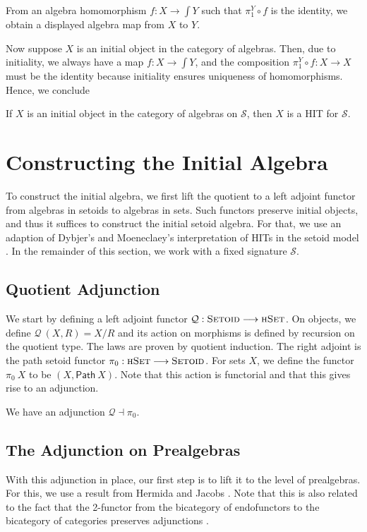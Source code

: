 \documentclass[9pt]{entcs}
\newcommand{\type}[1]{\textsc{#1}}
\newcommand{\category}[1]{\textsc{#1}}
\newcommand{\function}[1]{\mathsf{#1}}
\newcommand{\hset}{\type{hSet}} %
\newcommand{\0}{\textbf{0}} %
\newcommand{\setquot}[2]{#1 / #2} %
\newcommand{\compm}[2]{#2 \circ #1} %
\newcommand{\setoids}{\category{Setoid}} %
\newcommand{\functor}[2]{#1 \longrightarrow #2} %
\newcommand{\adj}[2]{#1 \dashv #2} %
\newcommand{\pathR}[1]{\function{Path} \> #1} %
\newcommand{\sig}{\mathcal{S}} %
\newcommand{\total}[1]{\int #1} %
\newcommand{\proj}[1]{\pi_1^{#1}} %
\newcommand{\quotF}{\mathcal{Q}}
\newcommand{\pathF}{\pi_0}
\begin{document}
\begin{proposition}
From an algebra homomorphism $f : X \rightarrow \total{Y}$ such that $\compm{f}{\proj{Y}}$ is the identity, we obtain a displayed algebra map from $X$ to $Y$.
\end{proposition}

Now suppose $X$ is an initial object in the category of algebras.
Then, due to initiality, we always have a map $f : X \rightarrow \total{Y}$, and the composition $\compm{f}{\proj{Y}} : X \rightarrow X$ must be the identity because initiality ensures uniqueness of homomorphisms.
Hence, we conclude

\begin{corollary}
If $X$ is an initial object in the category of algebras on $\sig$, then $X$ is a HIT for $\sig$.
\end{corollary}

\section{Constructing the Initial Algebra}
\label{sec:construction}
To construct the initial algebra, we first lift the quotient to a left adjoint functor from algebras in setoids to algebras in sets.
Such functors preserve initial objects, and thus it suffices to construct the initial setoid algebra.
For that, we use an adaption of Dybjer's and Moeneclaey's interpretation of HITs in the setoid model \cite{DybjerM18,moeneclaey2016schema}.
In the remainder of this section, we work with a fixed signature $\sig$.

\subsection{Quotient Adjunction}
We start by defining a left adjoint functor $\quotF : \functor{\setoids}{\hset}$.
On objects, we define $\quotF \> (X , R) = \setquot{X}{R}$ and its action on morphisms is defined by recursion on the quotient type.
The laws are proven by quotient induction.
The right adjoint is the path setoid functor $\pathF : \functor{\hset}{\setoids}$.
For sets $X$, we define the functor $\pathF \> X$ to be $(X, \pathR{X})$.
Note that this action is functorial and that this gives rise to an adjunction.

\begin{lemma}
We have an adjunction $\adj{\quotF}{\pathF}$.
\end{lemma}

\subsection{The Adjunction on Prealgebras}
With this adjunction in place, our first step is to lift it to the level of prealgebras.
For this, we use a result from Hermida and Jacobs \cite{hermida1998structural}.
Note that this is also related to the fact that the 2-functor from the bicategory of endofunctors to the bicategory of categories preserves adjunctions \cite{street1972formal}.
\end{document}
